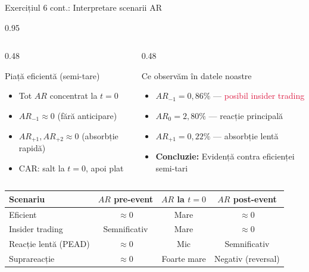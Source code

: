 \documentclass[9pt, aspectratio=169, t]{beamer}
\begin{document}
\begin{frame}[shrink=15]{Exercițiul 6 cont.: Interpretare scenarii AR}
\begin{cminipage}{0.95\textwidth}
\begin{columns}[T]
\begin{column}{0.48\textwidth}
\begin{block}{Piață eficientă (semi-tare)}
\begin{itemize}\setlength{\itemsep}{0pt}
    \item Tot $AR$ concentrat la $t=0$
    \item $AR_{-1} \approx 0$ (fără anticipare)
    \item $AR_{+1}, AR_{+2} \approx 0$ (absorbție rapidă)
    \item CAR: salt la $t=0$, apoi plat
\end{itemize}
\end{block}
\end{column}
\begin{column}{0.48\textwidth}
\begin{block}{Ce observăm în datele noastre}
\begin{itemize}\setlength{\itemsep}{0pt}
    \item $AR_{-1} = 0{,}86\%$ --- \textcolor{Crimson}{posibil insider trading}
    \item $AR_0 = 2{,}80\%$ --- reacție principală
    \item $AR_{+1} = 0{,}22\%$ --- absorbție lentă
    \item \textbf{Concluzie:} Evidență contra eficienței semi-tari
\end{itemize}
\end{block}
\end{column}
\end{columns}

\vspace{0.3cm}
\renewcommand{\arraystretch}{1.2}
\begin{center}
\footnotesize
\begin{tabular}{lccc}
\toprule
\textbf{Scenariu} & \textbf{$AR$ pre-event} & \textbf{$AR$ la $t=0$} & \textbf{$AR$ post-event} \\
\midrule
Eficient & $\approx 0$ & Mare & $\approx 0$ \\
Insider trading & Semnificativ & Mare & $\approx 0$ \\
Reacție lentă (PEAD) & $\approx 0$ & Mic & Semnificativ \\
Suprareacție & $\approx 0$ & Foarte mare & Negativ (reversal) \\
\bottomrule
\end{tabular}
\end{center}
\end{cminipage}
\end{frame}
\end{document}
